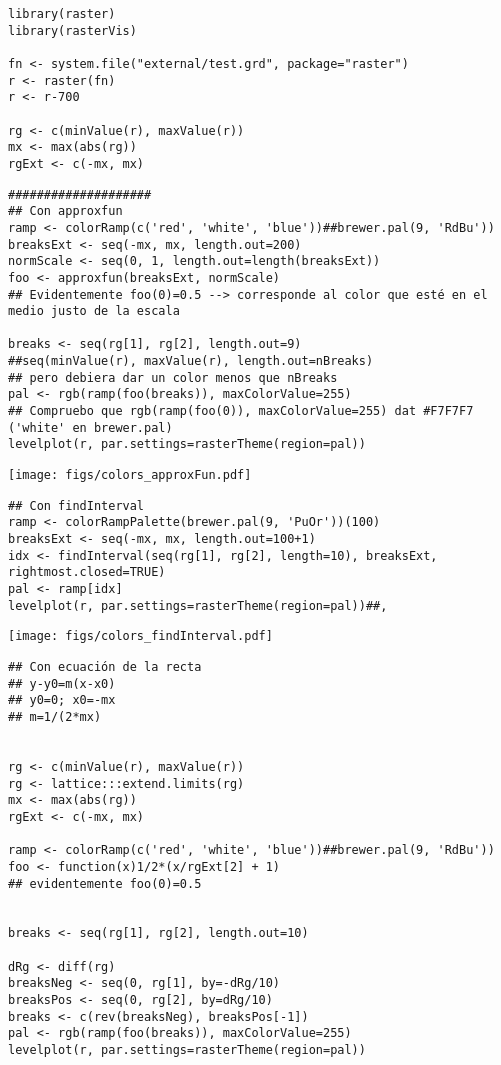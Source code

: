 



\lstset{language=R}
\begin{lstlisting}
library(raster)
library(rasterVis)

fn <- system.file("external/test.grd", package="raster")
r <- raster(fn)
r <- r-700

rg <- c(minValue(r), maxValue(r))
mx <- max(abs(rg))
rgExt <- c(-mx, mx)
\end{lstlisting}


\lstset{language=R}
\begin{lstlisting}
####################
## Con approxfun
ramp <- colorRamp(c('red', 'white', 'blue'))##brewer.pal(9, 'RdBu'))
breaksExt <- seq(-mx, mx, length.out=200)
normScale <- seq(0, 1, length.out=length(breaksExt))
foo <- approxfun(breaksExt, normScale)
## Evidentemente foo(0)=0.5 --> corresponde al color que esté en el medio justo de la escala

breaks <- seq(rg[1], rg[2], length.out=9)
##seq(minValue(r), maxValue(r), length.out=nBreaks)
## pero debiera dar un color menos que nBreaks
pal <- rgb(ramp(foo(breaks)), maxColorValue=255)
## Compruebo que rgb(ramp(foo(0)), maxColorValue=255) dat #F7F7F7 ('white' en brewer.pal)
levelplot(r, par.settings=rasterTheme(region=pal))
\end{lstlisting}

\texttt{[image: figs/colors\_approxFun.pdf]}



\lstset{language=R}
\begin{lstlisting}
## Con findInterval
ramp <- colorRampPalette(brewer.pal(9, 'PuOr'))(100)
breaksExt <- seq(-mx, mx, length.out=100+1)
idx <- findInterval(seq(rg[1], rg[2], length=10), breaksExt, rightmost.closed=TRUE)
pal <- ramp[idx]
levelplot(r, par.settings=rasterTheme(region=pal))##,
\end{lstlisting}

\texttt{[image: figs/colors\_findInterval.pdf]}


\lstset{language=R}
\begin{lstlisting}
## Con ecuación de la recta
## y-y0=m(x-x0)
## y0=0; x0=-mx
## m=1/(2*mx)


rg <- c(minValue(r), maxValue(r))
rg <- lattice:::extend.limits(rg)
mx <- max(abs(rg))
rgExt <- c(-mx, mx)

ramp <- colorRamp(c('red', 'white', 'blue'))##brewer.pal(9, 'RdBu'))
foo <- function(x)1/2*(x/rgExt[2] + 1)
## evidentemente foo(0)=0.5


breaks <- seq(rg[1], rg[2], length.out=10)

dRg <- diff(rg)
breaksNeg <- seq(0, rg[1], by=-dRg/10)
breaksPos <- seq(0, rg[2], by=dRg/10)
breaks <- c(rev(breaksNeg), breaksPos[-1])
pal <- rgb(ramp(foo(breaks)), maxColorValue=255)
levelplot(r, par.settings=rasterTheme(region=pal))
\end{lstlisting}


